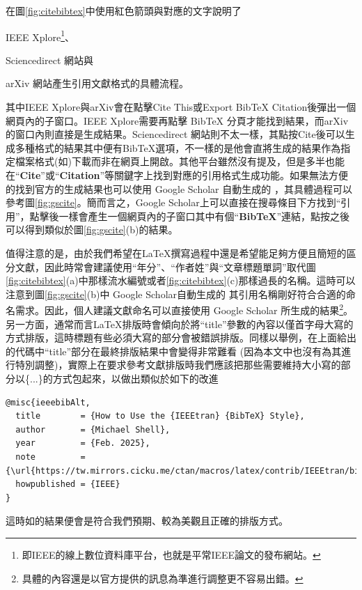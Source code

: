 \documentclass[12pt]{report}
\theoremstyle{plain}
\begin{document}
在圖\ref{fig:citebibtex}中使用紅色箭頭與對應的文字說明了
\begin{enumerate*}
    \item IEEE Xplore\footnote{即IEEE的線上數位資料庫平台，也就是平常IEEE論文的發布網站。}、
    \item Sciencedirect 網站與
    \item arXiv 網站產生\BibTeX 引用文獻格式的具體流程。
\end{enumerate*}
其中IEEE Xplore與arXiv會在點擊Cite This或Export BibTeX Citation後彈出一個網頁內的子窗口。IEEE Xplore需要再點擊 BibTeX 分頁才能找到結果，而arXiv的窗口內則直接是生成結果。Sciencedirect 網站則不太一樣，其點按Cite後可以生成多種格式的結果其中便有BibTeX選項，不一樣的是他會直將生成的結果作為指定檔案格式(如)下載而非在網頁上開啟。其他平台雖然沒有提及，但是多半也能在``\textbf{Cite}''或``\textbf{Citation}''等關鍵字上找到對應的引用格式生成功能。如果無法方便的找到官方的生成結果也可以使用 Google Scholar 自動生成的 \BibTeX ，其具體過程可以參考圖\ref{fig:gscite}。簡而言之，Google Scholar上可以直接在搜尋條目下方找到``引用''，點擊後一樣會產生一個網頁內的子窗口其中有個``\textbf{BibTeX}''連結，點按之後可以得到類似於圖\ref{fig:gscite}(b)的\BibTeX 結果。

值得注意的是，由於我們希望在\LaTeX 撰寫過程中還是希望能足夠方便且簡短的區分文獻，因此時常會建議使用``年分''、``作者姓''與``文章標題單詞''取代圖\ref{fig:citebibtex}(a)中那樣流水編號或者\ref{fig:citebibtex}(c)那樣過長的名稱。這時可以注意到圖\ref{fig:gscite}(b)中 Google Scholar自動生成的 \BibTeX 其引用名稱剛好符合合適的命名需求。因此，個人建議\BibTeX 文獻命名可以直接使用 Google Scholar 所生成的結果\footnote{具體的\BibTeX 內容還是以官方提供的訊息為準進行調整更不容易出錯。}。另一方面，通常而言\LaTeX 排版時會傾向於將``title''參數的內容以僅首字母大寫的方式排版，這時標題有些必須大寫的部分會被錯誤排版。同樣以\cite{ieeebib}舉例，在上面給出的代碼中``title''部分在最終排版結果中會變得非常難看 (因為本文中也沒有為其進行特別調整)，實際上在要求參考文獻排版時我們應該把那些需要維持大小寫的部分以\{...\}的方式包起來，以做出類似於如下的改進
\begin{lstlisting}
@misc{ieeebibAlt,
  title        = {How to Use the {IEEEtran} {BibTeX} Style},
  author       = {Michael Shell},
  year         = {Feb. 2025},
  note         = {\url{https://tw.mirrors.cicku.me/ctan/macros/latex/contrib/IEEEtran/bibtex/IEEEtran_bst_HOWTO.pdf}},
  howpublished = {IEEE}
}
\end{lstlisting}
這時如\cite{ieeebibAlt}的結果便會是符合我們預期、較為美觀且正確的排版方式。
\end{document}
